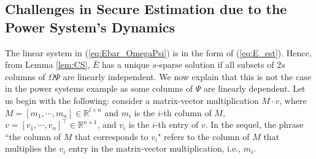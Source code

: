 
\subsection{Challenges in Secure Estimation due to the Power System's Dynamics}\label{V_B}
The linear system in (\ref{eq:Ebar_OmegaPsi}) is in the form of (\ref{eq:E_est}). Hence, from Lemma \ref{lem:CS}, $\bar E$ has a unique $s$-sparse solution if all subsets of $2s$ columns of  $\Omega\Psi$ are linearly independent.
We now explain that this is not the case in the power systems example as some columns of $\Psi$ are linearly dependent.
Let us begin with the following: consider a matrix-vector multiplication $M \cdot v$, where $M = [ m_1, \cdots, m_n ] \in \mathbb{R}^{l \times n}$ and $m_i$ is the $i$-th column of $M$, $v = [ v_1, \cdots, v_n ] ^\top \in \mathbb{R}^{n \times 1}$, and $v_i$ is the $i$-th entry of $v$. In the sequel, the phrase ``the column of $M$ that corresponds to $v_i$" refers to the column of $M$ that multiplies the $v_i$ entry in the matrix-vector multiplication, i.e., $m_i$.

